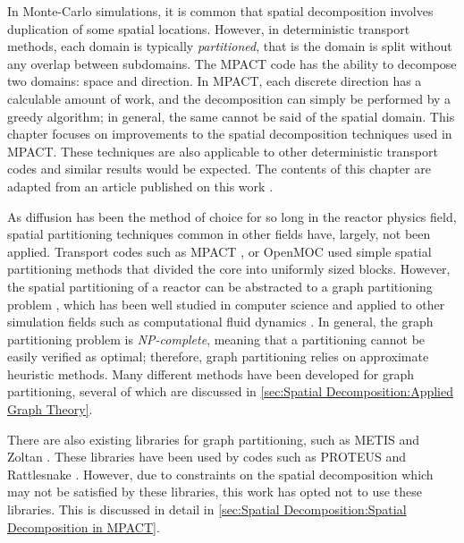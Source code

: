 {{    In Monte-Carlo simulations, it is common that spatial decomposition involves duplication of some spatial locations.
    However, in deterministic transport methods, each domain is typically \emph{partitioned}, that is the domain is split without any overlap between subdomains.
    The MPACT \cite{MPACT2016} code has the ability to decompose two domains: space and direction.
    In MPACT, each discrete direction has a calculable amount of work, and the decomposition can simply be performed by a greedy algorithm; in general, the same cannot be said of the spatial domain.
    This chapter focuses on improvements to the spatial decomposition techniques used in MPACT.
    These techniques are also applicable to other deterministic transport codes and similar results would be expected.
    The contents of this chapter are adapted from an article published on this work \cite{Fitzgerald2019a}.

    As diffusion has been the method of choice for so long in the reactor physics field, spatial partitioning techniques common in other fields have, largely, not been applied.
    Transport codes such as MPACT \cite{MPACT2016}, or OpenMOC \cite{Gunow2018} used simple spatial partitioning methods that divided the core into uniformly sized blocks.
    However, the spatial partitioning of a reactor can be abstracted to a graph partitioning problem \cite{Fitzgerald2017}, which has been well studied in computer science \cite{Elsner1997} and applied to other simulation fields such as computational fluid dynamics \cite{Yao1998}.
    In general, the graph partitioning problem is \emph{NP-complete}, meaning that a partitioning cannot be easily verified as optimal; therefore, graph partitioning relies on approximate heuristic methods.
    Many different methods have been developed for graph partitioning, several of which are discussed in \cref{sec:Spatial Decomposition:Applied Graph Theory}.

    There are also existing libraries for graph partitioning, such as METIS\cite{METIS} and Zoltan \cite{Boman2012}.
    These libraries have been used by codes such as PROTEUS and Rattlesnake \cite{Marin-Lafleche2013,Rattlesnake}.
    However, due to constraints on the spatial decomposition which may not be satisfied by these libraries, this work has opted not to use these libraries.
    This is discussed in detail in \cref{sec:Spatial Decomposition:Spatial Decomposition in MPACT}.

}}
